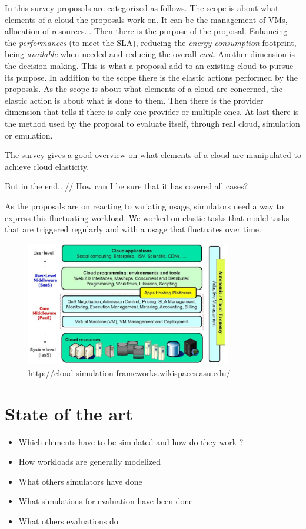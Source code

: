 \documentclass[a4paper]{IEEEtran}
\begin{document}
  In this survey proposals are categorized as follows. The scope is about what
  elements of a cloud the proposals work on. It can be the management of VMs,
  allocation of resources... Then there is the purpose of the proposal.
  Enhancing the \textit{performances} (to meet the SLA), reducing the
  \textit{energy consumption} footprint, being \textit{available} when needed
  and reducing the overall \textit{cost}. Another dimension is the decision
  making. This is what a proposal add to an existing cloud to pursue its
  purpose. In addition to the scope there is the elastic actions performed by
  the proposals. As the scope is about what elements of a cloud are concerned,
  the elastic action is about what is done to them. Then there is the provider
  dimension that tells if there is only one provider or multiple ones. At last
  there is the method used by the proposal to evaluate itself, through real
  cloud, simulation or emulation.
  
  The survey gives a good overview on what elements of a cloud are
  manipulated to achieve cloud elasticity.
  
  But in the end..
  // How can I be sure that it has covered all cases?
  
  As the proposals are on reacting to variating usage, simulators need a way
  to express this fluctuating workload. We worked on elastic tasks that model
  tasks that are triggered regularly and with a usage that fluctuates over
  time.

  
  \begin{figure}
    \label{cloud_arch}
    \caption{http://cloud-simulation-frameworks.wikispaces.asu.edu/}
    \centering
    \includegraphics[width=0.8\textwidth]{../plots/cloud_architecture}
  \end{figure}

\section{State of the art} \label{sota}
  \begin{itemize}
    \item Which elements have to be simulated and how do they work ?
    \item How workloads are generally modelized
    \item What others simulators have done
    \item What simulations for evaluation have been done
    \item What others evaluations do
  \end{itemize}
  
\end{document}
